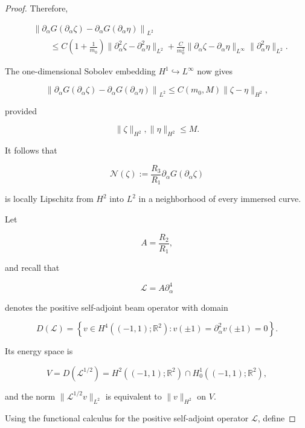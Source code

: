 \documentclass[10pt,a4paper]{amsart}
\begin{document}
\begin{proof}
Therefore,

$$
\begin{aligned}
    &
    \left\|
        \partial_\alpha G(\partial_\alpha\zeta)
        -
        \partial_\alpha G(\partial_\alpha\eta)
    \right\|_{L^2}\\
    &\qquad\leq
    C\left(1+\frac1{m_0}\right)
    \|\partial_\alpha^2\zeta-\partial_\alpha^2\eta\|_{L^2}
    +
    \frac{C}{m_0^2}
    \|\partial_\alpha\zeta-\partial_\alpha\eta\|_{L^\infty}
    \|\partial_\alpha^2\eta\|_{L^2}.
\end{aligned}
$$

The one-dimensional Sobolev embedding \(H^1\hookrightarrow L^\infty\) now gives

\begin{equation}
    \left\|
        \partial_\alpha G(\partial_\alpha\zeta)
        -
        \partial_\alpha G(\partial_\alpha\eta)
    \right\|_{L^2}
    \leq
    C(m_0,M)\|\zeta-\eta\|_{H^2},
    \label{lipschitz estimate}
\end{equation}

provided

$$
    \|\zeta\|_{H^2},\|\eta\|_{H^2}\leq M.
$$

It follows that

$$
    \mathcal N(\zeta)
    :=
    \frac{R_3}{R_1}
    \partial_\alpha G(\partial_\alpha\zeta)
$$

is locally Lipschitz from \(H^2\) into \(L^2\) in a neighborhood of every immersed curve.
\newline

Let

$$
    A=\frac{R_2}{R_1},
$$

and recall that

$$
    \mathcal L=A\partial_\alpha^4
$$

denotes the positive self-adjoint beam operator with domain

$$
    D(\mathcal L)
    =
    \left\{
        v\in H^4((-1,1);\mathbb R^2):
        v(\pm1)=\partial_\alpha^2v(\pm1)=0
    \right\}.
$$

Its energy space is

$$
    V=D(\mathcal L^{1/2})
      =H^2((-1,1);\mathbb R^2)\cap H_0^1((-1,1);\mathbb R^2),
$$

and the norm \(\|\mathcal L^{1/2}v\|_{L^2}\) is equivalent to \(\|v\|_{H^2}\) on \(V\).

Using the functional calculus for the positive self-adjoint operator \(\mathcal L\), define


\end{proof}
\end{document}
